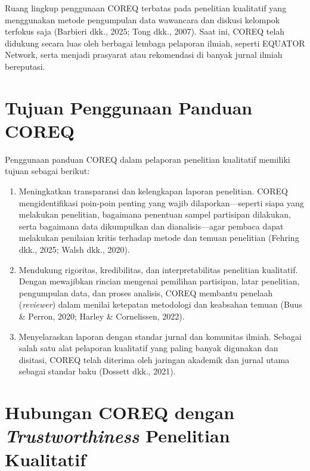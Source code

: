\documentclass[
  indonesian,
  letterpaper,
  DIV=11,
  numbers=noendperiod]{scrreprt}
\providecommand{\tightlist}{%
  \setlength{\itemsep}{0pt}\setlength{\parskip}{0pt}}
\begin{document}
Ruang lingkup penggunaan COREQ terbatas pada penelitian kualitatif yang
menggunakan metode pengumpulan data wawancara dan diskusi kelompok
terfokus saja (Barbieri dkk., 2025; Tong dkk., 2007). Saat ini, COREQ
telah didukung secara luas oleh berbagai lembaga pelaporan ilmiah,
seperti EQUATOR Network, serta menjadi prasyarat atau rekomendasi di
banyak jurnal ilmiah bereputasi.

\section{Tujuan Penggunaan Panduan
COREQ}\label{tujuan-penggunaan-panduan-coreq}

Penggunaan panduan COREQ dalam pelaporan penelitian kualitatif memiliki
tujuan sebagai berikut:

\begin{enumerate}
\def\labelenumi{\alph{enumi}.}
\tightlist
\item
  Meningkatkan transparansi dan kelengkapan laporan penelitian. COREQ
  mengidentifikasi poin-poin penting yang wajib dilaporkan---seperti
  siapa yang melakukan penelitian, bagaimana penentuan sampel partisipan
  dilakukan, serta bagaimana data dikumpulkan dan dianalisis---agar
  pembaca dapat melakukan penilaian kritis terhadap metode dan temuan
  penelitian (Fehring dkk., 2025; Walsh dkk., 2020).
\item
  Mendukung rigoritas, kredibilitas, dan interpretabilitas penelitian
  kualitatif. Dengan mewajibkan rincian mengenai pemilihan partisipan,
  latar penelitian, pengumpulan data, dan proses analisis, COREQ
  membantu penelaah (\emph{reviewer}) dalam menilai ketepatan metodologi
  dan keabsahan temuan (Buus \& Perron, 2020; Harley \& Cornelissen,
  2022).
\item
  Menyelaraskan laporan dengan standar jurnal dan komunitas ilmiah.
  Sebagai salah satu alat pelaporan kualitatif yang paling banyak
  digunakan dan disitasi, COREQ telah diterima oleh jaringan akademik
  dan jurnal utama sebagai standar baku (Dossett dkk., 2021).
\end{enumerate}

\section{\texorpdfstring{Hubungan COREQ dengan \emph{Trustworthiness}
Penelitian
Kualitatif}{Hubungan COREQ dengan Trustworthiness Penelitian Kualitatif}}\label{hubungan-coreq-dengan-trustworthiness-penelitian-kualitatif}
\end{document}
